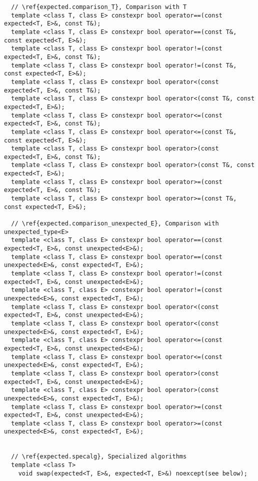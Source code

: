 \documentclass[a4paper,10pt]{article}
\begin{document}
\begin{lstlisting}
  // \ref{expected.comparison_T}, Comparison with T
  template <class T, class E> constexpr bool operator==(const expected<T, E>&, const T&);
  template <class T, class E> constexpr bool operator==(const T&, const expected<T, E>&);
  template <class T, class E> constexpr bool operator!=(const expected<T, E>&, const T&);
  template <class T, class E> constexpr bool operator!=(const T&, const expected<T, E>&);
  template <class T, class E> constexpr bool operator<(const expected<T, E>&, const T&);
  template <class T, class E> constexpr bool operator<(const T&, const expected<T, E>&);
  template <class T, class E> constexpr bool operator<=(const expected<T, E>&, const T&);
  template <class T, class E> constexpr bool operator<=(const T&, const expected<T, E>&);
  template <class T, class E> constexpr bool operator>(const expected<T, E>&, const T&);
  template <class T, class E> constexpr bool operator>(const T&, const expected<T, E>&);
  template <class T, class E> constexpr bool operator>=(const expected<T, E>&, const T&);
  template <class T, class E> constexpr bool operator>=(const T&, const expected<T, E>&);

  // \ref{expected.comparison_unexpected_E}, Comparison with unexpected_type<E>
  template <class T, class E> constexpr bool operator==(const expected<T, E>&, const unexpected<E>&);
  template <class T, class E> constexpr bool operator==(const unexpected<E>&, const expected<T, E>&);
  template <class T, class E> constexpr bool operator!=(const expected<T, E>&, const unexpected<E>&);
  template <class T, class E> constexpr bool operator!=(const unexpected<E>&, const expected<T, E>&);
  template <class T, class E> constexpr bool operator<(const expected<T, E>&, const unexpected<E>&);
  template <class T, class E> constexpr bool operator<(const unexpected<E>&, const expected<T, E>&);
  template <class T, class E> constexpr bool operator<=(const expected<T, E>&, const unexpected<E>&);
  template <class T, class E> constexpr bool operator<=(const unexpected<E>&, const expected<T, E>&);
  template <class T, class E> constexpr bool operator>(const expected<T, E>&, const unexpected<E>&);
  template <class T, class E> constexpr bool operator>(const unexpected<E>&, const expected<T, E>&);
  template <class T, class E> constexpr bool operator>=(const expected<T, E>&, const unexpected<E>&);
  template <class T, class E> constexpr bool operator>=(const unexpected<E>&, const expected<T, E>&);


  // \ref{expected.specalg}, Specialized algorithms
  template <class T> 
    void swap(expected<T, E>&, expected<T, E>&) noexcept(see below);


\end{lstlisting}
\end{document}
